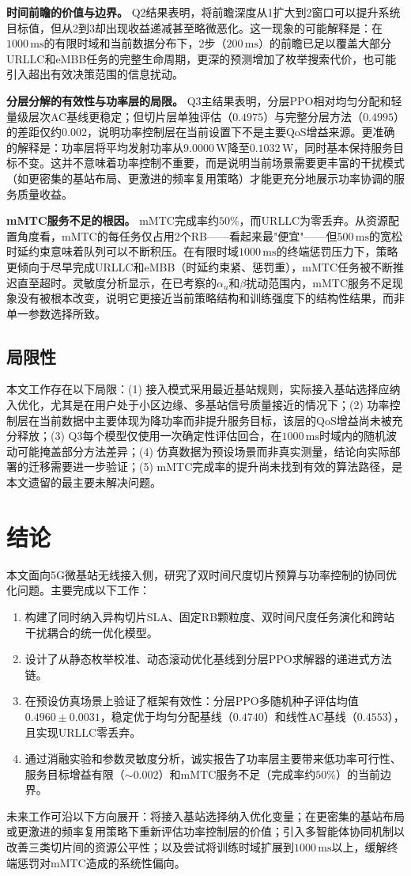 \documentclass[UTF8,a4paper,12pt,fontset=fandol]{ctexart}
\begin{document}
\textbf{时间前瞻的价值与边界。} Q2结果表明，将前瞻深度从1扩大到2窗口可以提升系统目标值，但从2到3却出现收益递减甚至略微恶化。这一现象的可能解释是：在$1000\,\mathrm{ms}$的有限时域和当前数据分布下，2步（$200\,\mathrm{ms}$）的前瞻已足以覆盖大部分URLLC和eMBB任务的完整生命周期，更深的预测增加了枚举搜索代价，也可能引入超出有效决策范围的信息扰动。

\textbf{分层分解的有效性与功率层的局限。} Q3主结果表明，分层PPO相对均匀分配和轻量级层次AC基线更稳定；但切片层单独评估（$0.4975$）与完整分层方法（$0.4995$）的差距仅约$0.002$，说明功率控制层在当前设置下不是主要QoS增益来源。更准确的解释是：功率层将平均发射功率从$9.0000\,\mathrm{W}$降至$0.1032\,\mathrm{W}$，同时基本保持服务目标不变。这并不意味着功率控制不重要，而是说明当前场景需要更丰富的干扰模式（如更密集的基站布局、更激进的频率复用策略）才能更充分地展示功率协调的服务质量收益。

\textbf{mMTC服务不足的根因。} mMTC完成率约$50\%$，而URLLC为零丢弃。从资源配置角度看，mMTC的每任务仅占用2个RB——看起来最"便宜"——但$500\,\mathrm{ms}$的宽松时延约束意味着队列可以不断积压。在有限时域$1000\,\mathrm{ms}$的终端惩罚压力下，策略更倾向于尽早完成URLLC和eMBB（时延约束紧、惩罚重），mMTC任务被不断推迟直至超时。灵敏度分析显示，在已考察的$\alpha_u$和$\beta$扰动范围内，mMTC服务不足现象没有被根本改变，说明它更接近当前策略结构和训练强度下的结构性结果，而非单一参数选择所致。

\subsection{局限性}

本文工作存在以下局限：(1) 接入模式采用最近基站规则，实际接入基站选择应纳入优化，尤其是在用户处于小区边缘、多基站信号质量接近的情况下；(2) 功率控制层在当前数据中主要体现为降功率而非提升服务目标，该层的QoS增益尚未被充分释放；(3) Q3每个模型仅使用一次确定性评估回合，在$1000\,\mathrm{ms}$时域内的随机波动可能掩盖部分方法差异；(4) 仿真数据为预设场景而非真实测量，结论向实际部署的迁移需要进一步验证；(5) mMTC完成率的提升尚未找到有效的算法路径，是本文遗留的最主要未解决问题。

\section{结论}

本文面向5G微基站无线接入侧，研究了双时间尺度切片预算与功率控制的协同优化问题。主要完成以下工作：

\begin{enumerate}[leftmargin=2em]
  \item 构建了同时纳入异构切片SLA、固定RB颗粒度、双时间尺度任务演化和跨站干扰耦合的统一优化模型。
  \item 设计了从静态枚举校准、动态滚动优化基线到分层PPO求解器的递进式方法链。
  \item 在预设仿真场景上验证了框架有效性：分层PPO多随机种子评估均值$0.4960\pm0.0031$，稳定优于均匀分配基线（$0.4740$）和线性AC基线（$0.4553$），且实现URLLC零丢弃。
  \item 通过消融实验和参数灵敏度分析，诚实报告了功率层主要带来低功率可行性、服务目标增益有限（$\sim0.002$）和mMTC服务不足（完成率约$50\%$）的当前边界。
\end{enumerate}

未来工作可沿以下方向展开：将接入基站选择纳入优化变量；在更密集的基站布局或更激进的频率复用策略下重新评估功率控制层的价值；引入多智能体协同机制以改善三类切片间的资源公平性；以及尝试将训练时域扩展到$1000\,\mathrm{ms}$以上，缓解终端惩罚对mMTC造成的系统性偏向。



\end{document}
